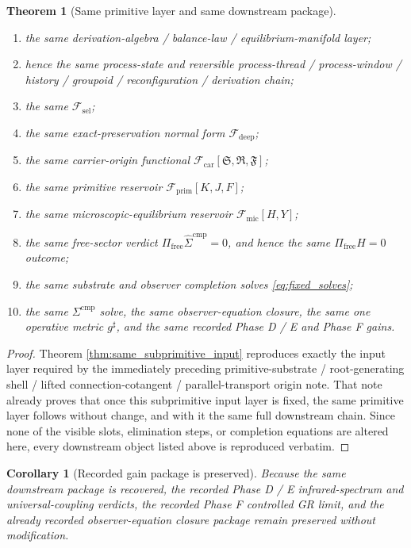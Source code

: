 \documentclass[11pt]{article}
\newcommand{\CompletedMetric}{g^{\sharp}}
\newcommand{\CompLift}{\widehat\Sigma^{\mathrm{cmp}}}
\newcommand{\FreeProj}{\Pi_{\mathrm{free}}}
\newcommand{\GaugeAux}{Y}
\newcommand{\MicFunctional}{\mathscr F_{\mathrm{mic}}}
\newcommand{\PrimFunctional}{\mathscr F_{\mathrm{prim}}}
\newcommand{\CarrierFunctional}{\mathscr F_{\mathrm{car}}}
\newcommand{\DeepFunctional}{\mathscr F_{\mathrm{deep}}}
\newcommand{\StemFunctional}{\mathscr F_{\mathrm{sel}}}
\newcommand{\PrimStrain}{K}
\newcommand{\PrimNeutral}{J}
\newcommand{\PrimFree}{F}
\newcommand{\CarrierSeed}{\mathfrak S}
\newcommand{\RelabelSeed}{\mathfrak R}
\newcommand{\FreeSeed}{\mathfrak F}
\newtheorem{corollary}{Corollary}
\newtheorem{theorem}{Theorem}
\begin{document}
\begin{theorem}[Same primitive layer and same downstream package]
\begin{enumerate}
    \item the same derivation-algebra / balance-law / equilibrium-manifold layer;
    \item hence the same process-state and reversible process-thread / process-window / history / groupoid / reconfiguration / derivation chain;
    \item the same \(\StemFunctional\);
    \item the same exact-preservation normal form \(\DeepFunctional\);
    \item the same carrier-origin functional \(\CarrierFunctional[\CarrierSeed,\RelabelSeed,\FreeSeed]\);
    \item the same primitive reservoir \(\PrimFunctional[\PrimStrain,\PrimNeutral,\PrimFree]\);
    \item the same microscopic-equilibrium reservoir \(\MicFunctional[H,\GaugeAux]\);
    \item the same free-sector verdict \(\FreeProj\CompLift=0\), and hence the same \(\Pi_{\mathrm{free}}H=0\) outcome;
    \item the same substrate and observer completion solves \eqref{eq:fixed_solves};
    \item the same \(\Sigma^{\mathrm{cmp}}\) solve, the same observer-equation closure, the same one operative metric \(\CompletedMetric\), and the same recorded Phase D / E and Phase F gains.
\end{enumerate}
\end{theorem}

\begin{proof}
Theorem \ref{thm:same_subprimitive_input} reproduces exactly the input layer required by the immediately preceding primitive-substrate / root-generating shell / lifted connection-cotangent / parallel-transport origin note. That note already proves that once this subprimitive input layer is fixed, the same primitive layer follows without change, and with it the same full downstream chain. Since none of the visible slots, elimination steps, or completion equations are altered here, every downstream object listed above is reproduced verbatim.
\end{proof}

\begin{corollary}[Recorded gain package is preserved]
\label{cor:gains}
Because the same downstream package is recovered, the recorded Phase D / E infrared-spectrum and universal-coupling verdicts, the recorded Phase F controlled GR limit, and the already recorded observer-equation closure package remain preserved without modification.
\end{corollary}
\end{document}
